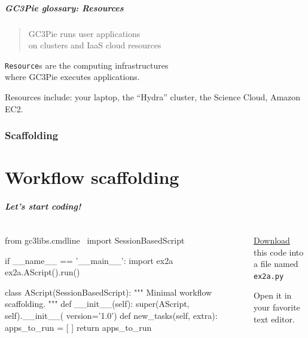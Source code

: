 \documentclass[english,serif,mathserif,xcolor=pdftex,dvipsnames,table]{beamer}
\begin{document}
\begin{frame}
  \frametitle{GC3Pie glossary: Resources}
  \begin{quote}
    GC3Pie runs user applications
    \\
    on clusters and IaaS cloud \alert{resources}
  \end{quote}

  \+ \alert{\texttt{Resource}s are the computing infrastructures \\ where GC3Pie executes applications.}

  \+ Resources include: your laptop, the ``Hydra'' cluster, the Science Cloud, Amazon EC2.
\end{frame}


\section{Scaffolding}
\part{Workflow scaffolding}

\begin{frame}[fragile]
  \frametitle{Let's start coding!}
  \begin{columns}
    \begin{column}{0.7\linewidth}
\begin{python}
from gc3libs.cmdline \
  import SessionBasedScript

if __name__ == '__main__':
  import ex2a
  ex2a.AScript().run()

class AScript(SessionBasedScript):
  """
  Minimal workflow scaffolding.
  """
  def __init__(self):
    super(AScript, self).__init__(
        version='1.0')
  def new_tasks(self, extra):
    apps_to_run = [ ]
    return apps_to_run
\end{python}
    \end{column}
    \begin{column}{0.3\linewidth}
      \href{https://raw.githubusercontent.com/uzh/gc3pie/training-july-2016/docs/programmers/tutorials/workflows/solutions/ex2a.py}{Download} this code into a file named \texttt{ex2a.py}

      \+
      Open it in your favorite text editor.
    \end{column}
  \end{columns}
\end{frame}
\end{document}

